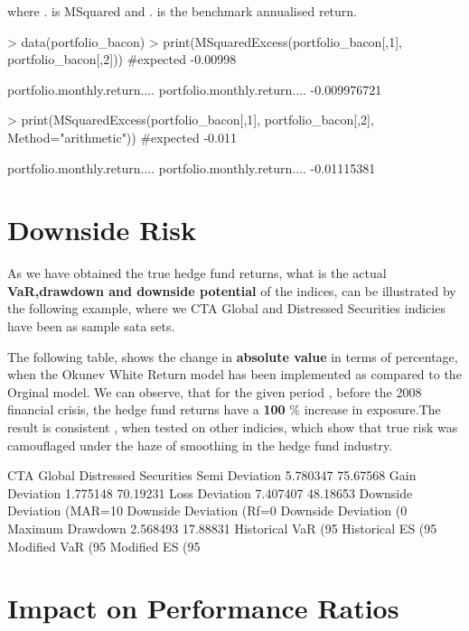\documentclass[12pt,letterpaper,english]{article}
\begin{document}
where . is MSquared and . is the benchmark annualised return.

\begin{Schunk}
\begin{Sinput}
> data(portfolio_bacon)
> print(MSquaredExcess(portfolio_bacon[,1], portfolio_bacon[,2])) #expected -0.00998
\end{Sinput}
\begin{Soutput}
                             portfolio.monthly.return....
portfolio.monthly.return....                 -0.009976721
\end{Soutput}
\begin{Sinput}
> print(MSquaredExcess(portfolio_bacon[,1], portfolio_bacon[,2], Method="arithmetic")) #expected -0.011
\end{Sinput}
\begin{Soutput}
                             portfolio.monthly.return....
portfolio.monthly.return....                  -0.01115381
\end{Soutput}
\end{Schunk}


\section{Downside Risk}
As we have obtained the true hedge fund returns, what is the actual \textbf{VaR,drawdown and downside potential} of the indices, can be illustrated by the following example, where we CTA Global and Distressed Securities indicies have been as sample sata sets.

The following table, shows the change in \textbf{absolute value} in terms of percentage, when the Okunev White Return model has been implemented as compared to the Orginal model. We can observe, that for the given period , before the 2008 financial crisis, the hedge fund returns have a \textbf{100} \% increase in exposure.The result is consistent , when tested on other indicies, which show that true risk was camouflaged under the haze of smoothing in the hedge fund industry.


\begin{Schunk}
\begin{Soutput}
                             CTA Global Distressed Securities
Semi Deviation                 5.780347              75.67568
Gain Deviation                 1.775148              70.19231
Loss Deviation                 7.407407              48.18653
Downside Deviation (MAR=10%
Downside Deviation (Rf=0%
Downside Deviation (0%
Maximum Drawdown               2.568493              17.88831
Historical VaR (95%
Historical ES (95%
Modified VaR (95%
Modified ES (95%
\end{Soutput}
\end{Schunk}

\section{Impact on Performance Ratios}
\end{document}
